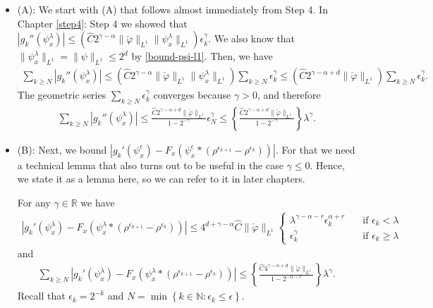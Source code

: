 \begin{itemize}
    \item (A): We start with (A) that follows almost immediately from Step 4. In Chapter \ref{step4}: Step 4 we showed that $|g_k''(\psi^{\lambda}_x)| 
    {\leq}  \left(\hat C  2^{\gamma - \alpha} \lVert \check \varphi \rVert_{L^1} \lVert \psi^{\lambda}_x \rVert_{L^1}\right) \epsilon_k^\gamma$. We also know that $\lVert \psi^\lambda_x \rVert_{L^1} = \lVert \psi \rVert_{L^1} \leq 2^d$ by \eqref{bound-psi-l1}.  Then, we have
    \begin{align*}
        \sum_{k \geq N} |g_k''(\psi^{\lambda}_x)|  \leq 
        \left(\hat C  2^{\gamma - \alpha} \lVert \check \varphi \rVert_{L^1} \lVert \psi^{\lambda}_x \rVert_{L^1}\right) \sum_{k \geq N}  \epsilon_k^\gamma 
        \leq \left(\hat C  2^{\gamma - \alpha + d} \lVert \check \varphi \rVert_{L^1} \right) \sum_{k \geq N}  \epsilon_k^\gamma.
    \end{align*}
    The geometric series $\sum\limits_{k \geq N}  \epsilon_k^\gamma$ converges because $\gamma > 0$, and therefore
    \begin{align*}
        \sum_{k \geq N} |g_k''(\psi^{\lambda}_x)| \leq 
        \frac{\hat C  2^{\gamma - \alpha + d} \lVert \check \varphi \rVert_{L^1}}{1-2^{-\gamma}} \epsilon_N^{\gamma}
        \leq
        \left\{\frac{\hat C  2^{\gamma - \alpha + d} \lVert \check \varphi \rVert_{L^1}}{1-2^{-\gamma}}\right\} \lambda^{\gamma}.
    \end{align*}
 
    \item (B): Next, we bound $|g_k'(\psi^\epsilon_x) - F_x(\psi^\epsilon_x * (\rho^{\epsilon_{k+1}} - \rho^{\epsilon_k}))|$. For that we need a technical lemma that also turns out to be useful in the case $\gamma \leq 0$. Hence, we state it as a lemma here, so we can refer to it in later chapters.
    

    \begin{lemma}\label{technical-lemma-2}
        For any $\gamma \in \mathbb{R}$ we have 
        \begin{align*}
            |g_k'(\psi^\lambda_x) - F_x(\psi^\lambda_x * (\rho^{\epsilon_{k+1}} - \rho^{\epsilon_k}))| \leq 4^{d + \gamma - \alpha} \hat C \lVert \check \varphi \rVert_{L^1} \begin{cases}
                \lambda^{\gamma - \alpha - r} \epsilon_k^{\alpha + r}  \quad &\text{if $\epsilon_k < \lambda$ }\\
                \epsilon_k^\gamma & \text{if $\epsilon_k \geq \lambda$ }
            \end{cases}
        \end{align*}
        and 
        \begin{align*}
            \sum_{k \geq N} |g_k'(\psi^\lambda_x) - F_x(\psi^\lambda_x * (\rho^{\epsilon_{k+1}} - \rho^{\epsilon_k}))|
            \leq
            \left \{ \frac{\hat C 4^{\gamma - \alpha + d} \lVert \check \varphi \rVert_{L^1} }{1-2^{-\alpha - r}} \right \} \lambda^{\gamma}.
        \end{align*}
        Recall that $\epsilon_k = 2^{-k}$ and $N = \min\left\{ k \in \mathbb{N}: \epsilon_k \leq \epsilon \right\}$.
    \end{lemma}


\end{itemize}
